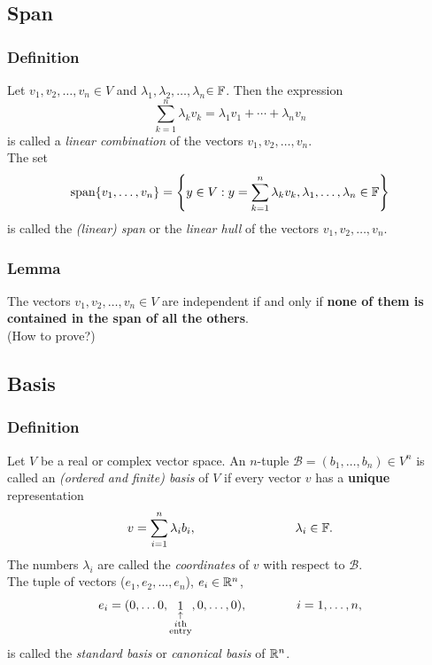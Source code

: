 \documentclass{beamer}
\renewcommand{\emph}[1]{{\color{Turquoise3}\textsl{#1}}}
\newcommand{\myseries}[2]{$#1_1,#1_2,\dots,#1_#2$}
\begin{document}
\subsection{Span}
\begin{frame}
    \frametitle{Definition}
    Let \myseries{v}{n}$\in V$ and \myseries{\lambda}{n}$\in\mathbb{F}$. Then the expression
    \begin{equation*}
        \sum_{k=1}^{n}\lambda_kv_k=\lambda_1v_1+\cdots+\lambda_nv_n
    \end{equation*}
    is called a \emph{linear combination} of the vectors \myseries{v}{n}.\\
    The set
    \[\text{span}\{v_1,\ldots,v_n\}=\left\{y\in V:y=\sum_{k=1}^{n}\lambda_kv_k,\lambda_1,\ldots,\lambda_n\in\mathbb{F}\right\}\]
    is called the \emph{(linear) span} or the \emph{linear hull} of the vectors \myseries{v}{n}.

\end{frame}

\begin{frame}
    \frametitle{Lemma}
    The vectors \myseries{v}{n}$\in V$ are independent if and only if
    \textbf{none of them is contained in the span of all the others}.
    \\[15pt]
    (How to prove?)
\end{frame}

\subsection{Basis}
\begin{frame}
    \frametitle{Definition}
    Let $V$ be a real or complex vector space. An $n$-tuple $\mathcal{B}=(b_1,\ldots,b_n)\in V^n$ is called an \emph{(ordered and finite) basis} of $V$
    if every vector $v$ has a \textbf{unique} representation
    \[v=\sum_{i=1}^{n}\lambda_ib_i,\qquad\qquad\qquad\qquad\lambda_i\in\mathbb{F}.\]
    The numbers $\lambda_i$ are called the \emph{coordinates} of $v$ with respect to $\mathcal{B}$.
    \\[15pt]
    The tuple of vectors (\myseries{e}{n}), $e_i\in\mathbb{R}^n$,
    \begin{equation*}
        e_i=(0,\ldots 0,\mathop{1}_{\begin{subarray}{c}
                \uparrow\\  i\text{th}\\ \text{entry}\end{subarray}},0,\ldots,0),\qquad\qquad i=1,\ldots,n,
    \end{equation*}
    is called the \emph{standard basis} or \emph{canonical basis} of $\mathbb{R}^n$.
\end{frame}
\end{document}
